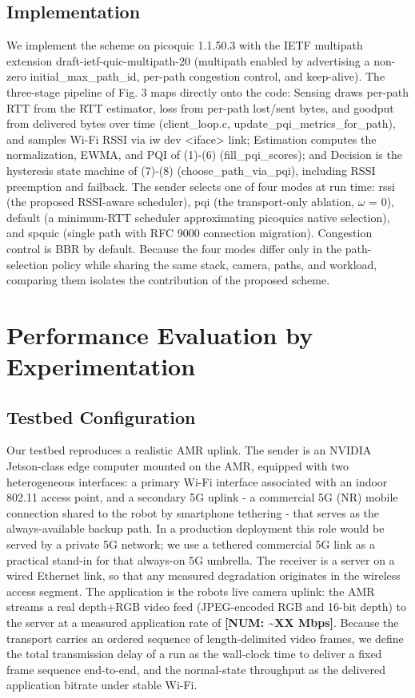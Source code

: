 \documentclass[preprint,11pt]{elsarticle}
\begin{document}
\subsection{Implementation}
We implement the scheme on picoquic 1.1.50.3 with the IETF multipath extension draft-ietf-quic-multipath-20 (multipath enabled by advertising a non-zero initial\_max\_path\_id, per-path congestion control, and keep-alive). The three-stage pipeline of Fig. 3 maps directly onto the code: Sensing draws per-path RTT from the RTT estimator, loss from per-path lost/sent bytes, and goodput from delivered bytes over time (client\_loop.c, update\_pqi\_metrics\_for\_path), and samples Wi-Fi RSSI via iw dev \textless iface\textgreater{} link; Estimation computes the normalization, EWMA, and PQI of (1)-(6) (fill\_pqi\_scores); and Decision is the hysteresis state machine of (7)-(8) (choose\_path\_via\_pqi), including RSSI preemption and failback. The sender selects one of four modes at run time: rssi (the proposed RSSI-aware scheduler), pqi (the transport-only ablation, $\omega$ = 0), default (a minimum-RTT scheduler approximating picoquic\textquotesingle s native selection), and spquic (single path with RFC 9000 connection migration). Congestion control is BBR by default. Because the four modes differ only in the path-selection policy while sharing the same stack, camera, paths, and workload, comparing them isolates the contribution of the proposed scheme.
\section{Performance Evaluation by Experimentation}
\subsection{Testbed Configuration}
Our testbed reproduces a realistic AMR uplink. The sender is an NVIDIA Jetson-class edge computer mounted on the AMR, equipped with two heterogeneous interfaces: a primary Wi-Fi interface associated with an indoor 802.11 access point, and a secondary 5G uplink - a commercial 5G (NR) mobile connection shared to the robot by smartphone tethering - that serves as the always-available backup path. In a production deployment this role would be served by a private 5G network; we use a tethered commercial 5G link as a practical stand-in for that always-on 5G umbrella. The receiver is a server on a wired Ethernet link, so that any measured degradation originates in the wireless access segment. The application is the robot\textquotesingle s live camera uplink: the AMR streams a real depth+RGB video feed (JPEG-encoded RGB and 16-bit depth) to the server at a measured application rate of \textbf{[NUM: \textasciitilde XX Mbps]}. Because the transport carries an ordered sequence of length-delimited video frames, we define the total transmission delay of a run as the wall-clock time to deliver a fixed frame sequence end-to-end, and the normal-state throughput as the delivered application bitrate under stable Wi-Fi.
\end{document}
